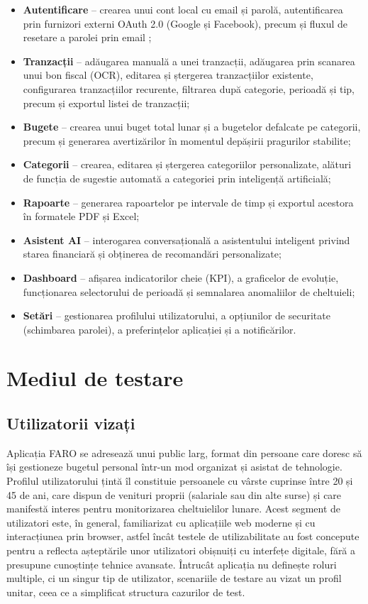 \documentclass[12pt,a4paper,oneside]{report}
\begin{document}
\begin{itemize}[leftmargin=2cm,itemsep=2pt]
    \item \textbf{Autentificare} -- crearea unui cont local cu email și parolă, autentificarea prin furnizori externi OAuth 2.0 (Google și Facebook), precum și fluxul de resetare a parolei prin email \cite{ref:oauth2};
    \item \textbf{Tranzacții} -- adăugarea manuală a unei tranzacții, adăugarea prin scanarea unui bon fiscal (OCR), editarea și ștergerea tranzacțiilor existente, configurarea tranzacțiilor recurente, filtrarea după categorie, perioadă și tip, precum și exportul listei de tranzacții;
    \item \textbf{Bugete} -- crearea unui buget total lunar și a bugetelor defalcate pe categorii, precum și generarea avertizărilor în momentul depășirii pragurilor stabilite;
    \item \textbf{Categorii} -- crearea, editarea și ștergerea categoriilor personalizate, alături de funcția de sugestie automată a categoriei prin inteligență artificială;
    \item \textbf{Rapoarte} -- generarea rapoartelor pe intervale de timp și exportul acestora în formatele PDF și Excel;
    \item \textbf{Asistent AI} -- interogarea conversațională a asistentului inteligent privind starea financiară și obținerea de recomandări personalizate;
    \item \textbf{Dashboard} -- afișarea indicatorilor cheie (KPI), a graficelor de evoluție, funcționarea selectorului de perioadă și semnalarea anomaliilor de cheltuieli;
    \item \textbf{Setări} -- gestionarea profilului utilizatorului, a opțiunilor de securitate (schimbarea parolei), a preferințelor aplicației și a notificărilor.
\end{itemize}

\section{Mediul de testare}

\subsection{Utilizatorii vizați}

Aplicația FARO se adresează unui public larg, format din persoane care doresc să își gestioneze bugetul personal într-un mod organizat și asistat de tehnologie. Profilul utilizatorului țintă îl constituie persoanele cu vârste cuprinse între 20 și 45 de ani, care dispun de venituri proprii (salariale sau din alte surse) și care manifestă interes pentru monitorizarea cheltuielilor lunare. Acest segment de utilizatori este, în general, familiarizat cu aplicațiile web moderne și cu interacțiunea prin browser, astfel încât testele de utilizabilitate au fost concepute pentru a reflecta așteptările unor utilizatori obișnuiți cu interfețe digitale, fără a presupune cunoștințe tehnice avansate. Întrucât aplicația nu definește roluri multiple, ci un singur tip de utilizator, scenariile de testare au vizat un profil unitar, ceea ce a simplificat structura cazurilor de test.
\end{document}
